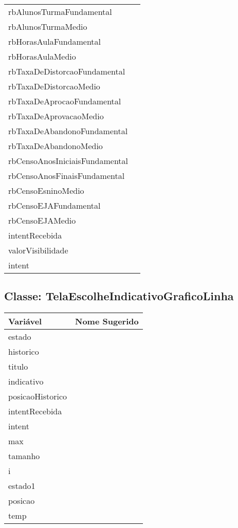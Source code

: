 \documentclass[12pt]{article}
\begin{document}
\begin{table}[H]
\begin{center}
\begin{tabular}{l | l}
						rbAlunosTurmaFundamental & \\
						rbAlunosTurmaMedio & \\
						rbHorasAulaFundamental & \\
						rbHorasAulaMedio & \\
						rbTaxaDeDistorcaoFundamental & \\
						rbTaxaDeDistorcaoMedio & \\
						rbTaxaDeAprocaoFundamental & \\
						rbTaxaDeAprovacaoMedio & \\
						rbTaxaDeAbandonoFundamental & \\
						rbTaxaDeAbandonoMedio & \\
						rbCensoAnosIniciaisFundamental & \\
						rbCensoAnosFinaisFundamental & \\
						rbCensoEsninoMedio & \\
						rbCensoEJAFundamental & \\
						rbCensoEJAMedio & \\
						intentRecebida & \\
						valorVisibilidade & \\
						intent & \\
					\bottomrule
				\end{tabular}
			\end{center}
		\end{table}

	\subsection{Classe: TelaEscolheIndicativoGraficoLinha}
		\begin{table}[H]
			\begin{center}
				\begin{tabular}{l | l}
					\toprule
						Variável & Nome Sugerido\\
					\midrule
						estado & \\
						historico & \\
						titulo & \\
						indicativo & \\
						posicaoHistorico & \\
						intentRecebida & \\
						intent & \\
						max & \\
						tamanho & \\
						i & \\
						estado1 & \\
						posicao & \\
						temp & \\
					\bottomrule
				\end{tabular}
			\end{center}
		\end{table}
\end{document}

